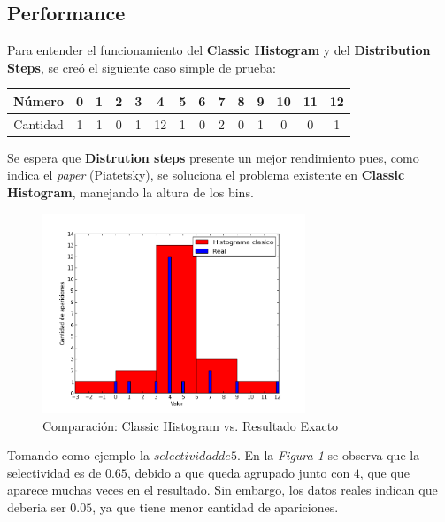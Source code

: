 \documentclass[10pt, a4paper,english,spanish,hidelinks]{article}
\begin{document}
{\subsection{Performance}
Para entender el funcionamiento del \textbf{Classic Histogram} y del \textbf{Distribution Steps}, se creó el siguiente caso simple de prueba:

\begin{table}[htdp]
  \begin{center}
    \begin{tabular}{|c|c|c|c|c|c|c|c|c|c|c|c|c|c|} \hline
       Número  & 0 & 1 & 2 & 3 & 4 & 5 & 6 & 7 & 8 & 9 & 10 & 11 & 12 \\ \hline
       Cantidad & 1 & 1 & 0 & 1 & 12 & 1 & 0 & 2 & 0 & 1 & 0 & 0 & 1 \\ \hline
    \end{tabular}
  \end{center}
\end{table}


Se espera que \textbf{Distrution steps} presente un mejor rendimiento pues, como indica el \textit{paper} (Piatetsky),
se soluciona el problema existente en \textbf{Classic Histogram}, manejando la altura
de los bins.

\begin{figure}[h!]
  \centering
  \includegraphics[width=0.7\textwidth]{./imagenes/ejb1_ejemplo_classic_y_real.png}
  \caption{Comparación: Classic Histogram vs. Resultado Exacto}
\end{figure}


Tomando como ejemplo la $selectividad de 5$.
En la \textit{Figura 1} se observa que la selectividad es de $0.65$, debido a que queda agrupado junto
con $4$, que que aparece muchas veces en el resultado. Sin embargo, los datos reales indican que deberia ser $0.05$, ya que tiene menor cantidad de apariciones.

}
\end{document}
